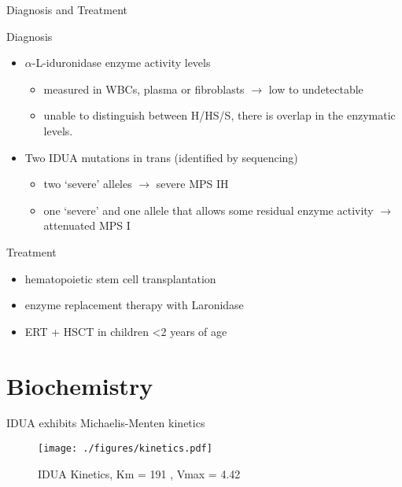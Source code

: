 \documentclass[presentation, smaller]{beamer}
\begin{document}
\begin{frame}[label={sec:orgd164dba}]{Diagnosis and Treatment}
\begin{block}{Diagnosis}
\begin{itemize}
\item \(\alpha\)-L-iduronidase enzyme activity levels
\begin{itemize}
\item measured in WBCs, plasma or fibroblasts \(\to\) low to undetectable
\item unable to distinguish between H/HS/S, there is overlap in the enzymatic levels.
\end{itemize}
\item Two ​IDUA mutations in trans (identified by sequencing)
\begin{itemize}
\item two ‘severe’ alleles \(\to\) severe MPS IH
\item one ‘severe’ and one allele that allows some residual enzyme
activity \(\to\) attenuated MPS I
\end{itemize}
\end{itemize}
\end{block}

\begin{block}{Treatment}
\begin{itemize}
\item hematopoietic stem cell transplantation
\item enzyme replacement therapy with Laronidase
\item ERT + HSCT in children <2 years of age
\end{itemize}
\end{block}
\end{frame}


\section{Biochemistry}
\label{sec:org09305ad}
\begin{frame}[label={sec:org9482acb}]{IDUA exhibits Michaelis-Menten kinetics}
\begin{figure}[htbp]
\centering
\texttt{[image: ./figures/kinetics.pdf]}
\caption{\label{fig:orgc4dc581}
IDUA Kinetics, Km = 191 , Vmax = 4.42}
\end{figure}
\end{frame}
\end{document}
